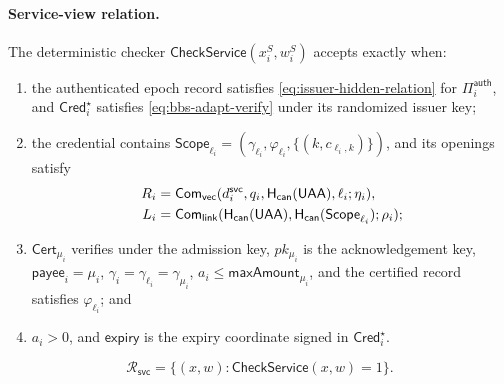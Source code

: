 \documentclass[letterpaper]{article}
\newcommand{\commit}{\mathsf{Com}}
\newcommand{\hash}{\mathsf{H}_{\mathsf{can}}}
\begin{document}
\paragraph{Service-view relation.}
The deterministic checker \(\mathsf{CheckService}(x_i^S,w_i^S)\) accepts
exactly when:
\begin{enumerate}
  \setlength{\itemsep}{0.15em}
  \setlength{\topsep}{0.25em}
  \item the authenticated epoch record satisfies
        \cref{eq:issuer-hidden-relation} for
        \(\Pi_i^{\mathsf{auth}}\), and \(\mathsf{Cred}_i^\star\) satisfies
        \cref{eq:bbs-adapt-verify} under its randomized issuer key;
  \item the credential contains
        \(\mathsf{Scope}_{\ell_i}=(\gamma_{\ell_i},
        \varphi_{\ell_i},\{(k,c_{\ell_i,k})\})\), and its openings satisfy
        \[
\ifdefined\MMAAAITwoColumn
        \begin{aligned}
        R_i&=\commit_{\mathsf{vec}}(d_i^{\mathsf{svc}},q_i,
          \hash(\mathsf{UAA}),\ell_i;\eta_i),\\
        L_i&=\commit_{\mathsf{link}}(\hash(\mathsf{UAA}),
          \hash(\mathsf{Scope}_{\ell_i});\rho_i);
        \end{aligned}
\else
        R_i=\commit_{\mathsf{vec}}(d_i^{\mathsf{svc}},q_i,
          \hash(\mathsf{UAA}),\ell_i;\eta_i),\quad
        L_i=\commit_{\mathsf{link}}(\hash(\mathsf{UAA}),
          \hash(\mathsf{Scope}_{\ell_i});\rho_i);
\fi
        \]
  \item \(\mathsf{Cert}_{\mu_i}\) verifies under the admission key,
        \(pk_{\mu_i}\) is the acknowledgement key,
        \(\mathsf{payee}_i=\mu_i\),
        \(\gamma_i=\gamma_{\ell_i}=\gamma_{\mu_i}\),
        \(a_i\le\mathsf{maxAmount}_{\mu_i}\),
        and the certified record satisfies \(\varphi_{\ell_i}\); and
  \item \(a_i>0\), and \(\mathsf{expiry}\) is the expiry coordinate signed
        in \(\mathsf{Cred}_i^\star\).
\end{enumerate}
\begin{equation}
  \mathcal R_{\mathsf{svc}}
  =\{(x,w):\mathsf{CheckService}(x,w)=1\}.
\label{eq:merchant-relation}
\end{equation}
\end{document}
